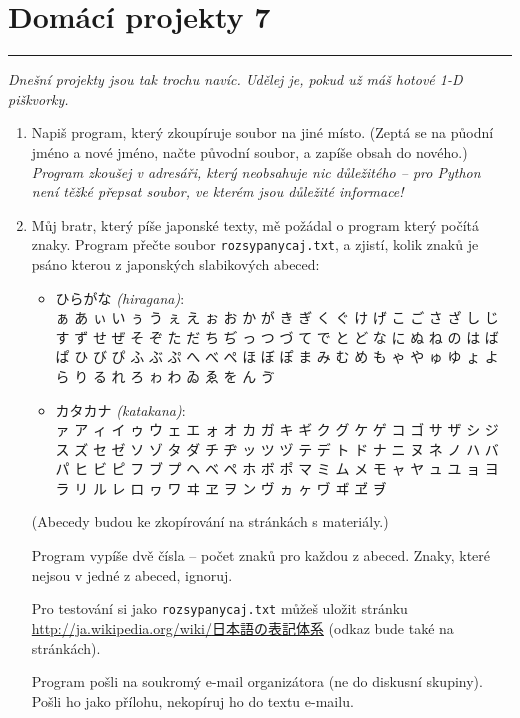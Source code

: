 \documentclass[a4paper,10pt]{article}
\newcommand\plsetno{7}
\newcommand\startsection[1]{
     \vspace{0.2ex}
    \hrule
    {\fontspec{Oxygen} \tiny
     \vspace{-1ex}
     \emph{#1}
     \vspace{-1.5em}
    }
}
\begin{document}
\section*{Domácí projekty \plsetno}

\startsection{Dnešní projekty jsou tak trochu navíc. Udělej je, pokud už máš hotové 1-D piškvorky.}

\begin{enumerate}[resume]

\item
    Napiš program, který zkoupíruje soubor na jiné místo.
    (Zeptá se na půodní jméno a nové jméno, načte původní soubor,
    a zapíše obsah do nového.)
    \\\emph{\small Program zkoušej v adresáři, který neobsahuje nic
        důležitého – pro Python není těžké přepsat soubor,
        ve kterém jsou důležité informace!}

\item
    Můj bratr, který píše japonské texty, mě požádal o program
    který počítá znaky.
    Program přečte soubor \verb+rozsypanycaj.txt+, a zjistí,
    kolik znaků je psáno kterou z japonských slabikových abeced:
    \begin{itemize}
    \item { ひらがな \emph{(hiragana)}:
        \\ ぁ あ ぃ い ぅ う ぇ え ぉ お か が き ぎ く
        ぐ け げ こ ご さ ざ し じ す ず せ ぜ そ ぞ た
        だ ち ぢ っ つ づ て で と ど な に ぬ ね の は
        ば ぱ ひ び ぴ ふ ぶ ぷ へ べ ぺ ほ ぼ ぽ ま み
        む め も ゃ や ゅ ゆ ょ よ ら り る れ ろ ゎ わ
        ゐ ゑ を ん ゔ}
    \item { カタカナ \emph{(katakana)}:
        \\ ァ ア ィ イ ゥ ウ ェ エ ォ オ カ ガ キ ギ ク
        グ ケ ゲ コ ゴ サ ザ シ ジ ス ズ セ ゼ ソ ゾ タ
        ダ チ ヂ ッ ツ ヅ テ デ ト ド ナ ニ ヌ ネ ノ ハ
        バ パ ヒ ビ ピ フ ブ プ ヘ ベ ペ ホ ボ ポ マ ミ
        ム メ モ ャ ヤ ュ ユ ョ ヨ ラ リ ル レ ロ ヮ ワ
        ヰ ヱ ヲ ン ヴ ヵ ヶ ヷ ヸ ヹ ヺ}
    \end{itemize}
    (Abecedy budou ke zkopírování na stránkách s materiály.)

    Program vypíše dvě čísla – počet znaků pro každou z abeced.
    Znaky, které nejsou v jedné z abeced, ignoruj.

    Pro testování si jako \verb+rozsypanycaj.txt+ můžeš uložit stránku
    \href{http://ja.wikipedia.org/wiki/%E6%97%A5%E6%9C%AC%E8%AA%9E%E3%81%AE%E8%A1%A8%E8%A8%98%E4%BD%93%E7%B3%BB}{
        http://ja.wikipedia.org/wiki/{日本語の表記体系}}
    (odkaz bude také na stránkách).

    Program pošli na soukromý e-mail organizátora (ne do diskusní skupiny).
    Pošli ho jako přílohu, nekopíruj ho do textu e-mailu.

\end{enumerate}
\end{document}
